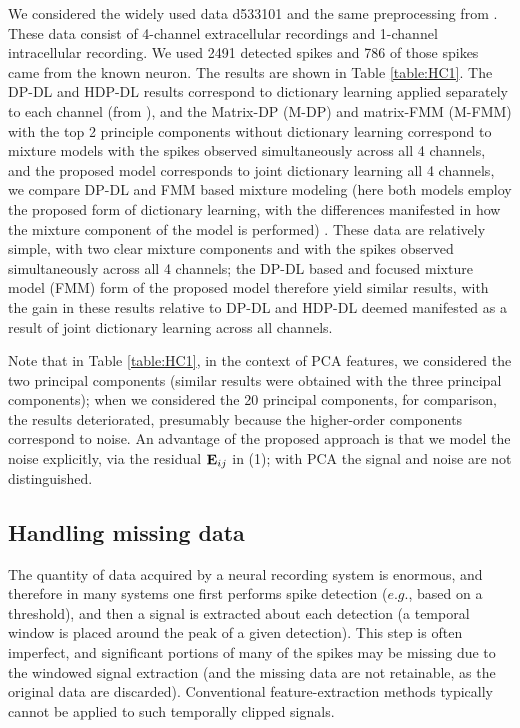 \documentclass[journal]{IEEEtran}
\begin{document}
We considered
the widely used data d533101 and the same
preprocessing from \cite{Calabrese2010}.
  These data consist of 4-channel extracellular recordings and 1-channel
  intracellular recording.  We used 2491 detected spikes and 786 of those
  spikes came from the known neuron. The results are shown in Table \ref{table:HC1}.
   The DP-DL and HDP-DL results correspond to dictionary learning applied separately to each channel (from \cite{Bo2011}), and the Matrix-DP (M-DP) and matrix-FMM (M-FMM) with the top 2 principle components without dictionary learning correspond to mixture models with the spikes observed simultaneously across all 4 channels, and the proposed model corresponds to joint dictionary learning all 4 channels, we compare DP-DL and FMM based mixture modeling (here both models employ the proposed form of dictionary learning, with the differences manifested in how the mixture component of the model is performed) . These data are relatively simple, with two clear mixture components and with the spikes observed simultaneously across all 4 channels; the DP-DL based and focused mixture model (FMM) form of the proposed model therefore yield similar results, with the gain in these results relative to DP-DL and HDP-DL deemed manifested as a result of joint dictionary learning across all channels. 
   
Note that in Table \ref{table:HC1}, in the context of PCA features, we considered the two principal components (similar results were obtained with the three principal components); when we considered the 20 principal components, for comparison, the results deteriorated, presumably because the higher-order components correspond to noise. An advantage of the proposed approach is that we model the noise explicitly, via the residual ${\mathbf E}_{ij}$ in (1); with PCA the signal and noise are not distinguished.

\subsection{Handling missing data}

The quantity of data acquired by a neural recording system is enormous, and therefore in many systems one first performs spike detection ($e.g.$, based on a threshold), and then a signal is extracted about each detection (a temporal window is placed around the peak of a given detection). This step is often imperfect, and significant portions of many of the spikes may be missing due to the windowed signal extraction (and the missing data are not retainable, as the original data are discarded). Conventional feature-extraction methods typically cannot be applied to such temporally clipped signals.
\end{document}

